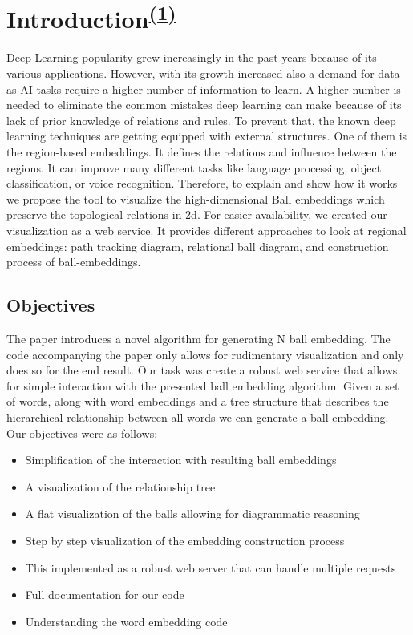 \chapter[Introduction]{Introduction\textsuperscript{\hyperref[Jan]{(1)}}}
Deep Learning popularity grew increasingly in the past years because of its various applications. However, with its growth increased also a demand for data as AI tasks require a higher number of information to learn. A higher number is needed to eliminate the common mistakes deep learning can make because of its lack of prior knowledge of relations and rules. To prevent that, the known deep learning techniques are getting equipped with external structures. One of them is the region-based embeddings. It defines the relations and influence between the regions. It can improve many different tasks like language processing, object classification, or voice recognition. Therefore, to explain and show how it works we propose the tool to visualize the high-dimensional Ball embeddings which preserve the topological relations in 2d. For easier availability, we created our visualization as a web service. It provides different approaches to look at regional embeddings: path tracking diagram, relational ball diagram, and construction process of ball-embeddings.

\section{Objectives}
\label{objectives}
The paper \cite{dong2018encoding} introduces a novel algorithm for generating N ball embedding. The code accompanying the paper only allows for rudimentary visualization and only does so for the end result. Our task was create a robust web service that allows for simple interaction with the presented ball embedding algorithm. 
Given a set of words, along with word embeddings and a tree structure that describes the hierarchical relationship between all words we can generate a ball embedding. \\

Our objectives were as follows:
\begin{itemize}
	\item Simplification of the interaction with resulting ball embeddings
	\item A visualization of the relationship tree
	\item A flat visualization of the balls allowing for diagrammatic reasoning
	\item Step by step visualization of the embedding construction process
	\item This implemented as a robust web server that can handle multiple requests
	\item Full documentation for our code
	\item Understanding the word embedding code
\end{itemize}


